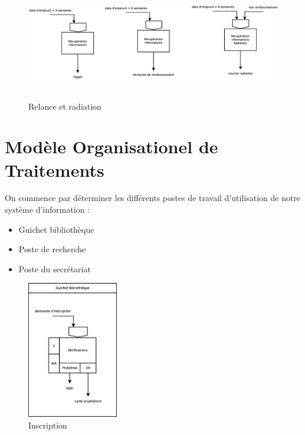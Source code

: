 \begin{figure}[!htb]
    \begin{center}
    \includegraphics[height=5cm]{images/cc1_mct4.eps}
    \caption{\label{cc1_mct4} Relance et radiation}
    \end{center}
\end{figure}

\newpage
\section*{Modèle Organisationel de Traitements}

On commence par déterminer les différents postes de travail d'utilisation de notre système d'information :\\

\begin{itemize}
    \item Guichet bibliothèque
    \item Poste de recherche
    \item Poste du secrétariat
\end{itemize}

\begin{figure}[!htb]
    \begin{center}
    \includegraphics[height=6cm]{images/cc1_mot1.eps}
    \caption{\label{cc1_mot1} Inscription}
    \end{center}
\end{figure}

